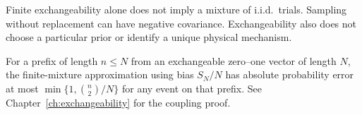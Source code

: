 \begin{warningbox}
Finite exchangeability alone does not imply a mixture of i.i.d.\
trials. Sampling without replacement can have negative covariance.
Exchangeability also does not choose a particular prior or identify
a unique physical mechanism.
\end{warningbox}

For a prefix of length $n\le N$ from an exchangeable zero--one vector
of length $N$, the finite-mixture approximation using bias $S_N/N$
has absolute probability error at most
$\min\{1,\binom n2/N\}$ for any event on that prefix.
See Chapter~\ref{ch:exchangeability} for the coupling proof.
